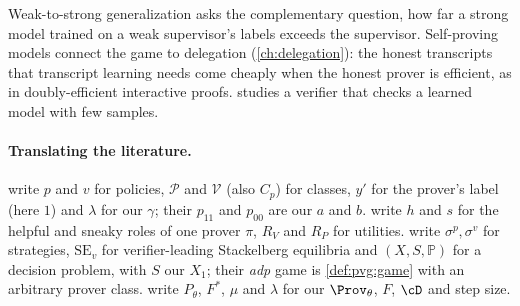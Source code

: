 \begin{refsection}
Weak-to-strong generalization \parencite{BurnsEtAl2024} asks the complementary question, how far a strong model trained on a weak supervisor's labels exceeds the supervisor. Self-proving models connect the game to delegation (\cref{ch:delegation}): the honest transcripts that transcript learning needs come cheaply when the honest prover is efficient, as in doubly-efficient interactive proofs.  studies a verifier that checks a learned model with few samples.

\paragraph{Translating the literature.} \Textcite{AnilEtAl2021} write $p$ and $v$ for policies, $\mathcal{P}$ and $\mathcal{V}$ (also $C_p$) for classes, $y'$ for the prover's label (here $1$) and $\lambda$ for our $\gamma$; their $p_{11}$ and $p_{00}$ are our $a$ and $b$. \Textcite{KirchnerEtAl2024} write $h$ and $s$ for the helpful and sneaky roles of one prover $\pi$, $R_V$ and $R_P$ for utilities. \Textcite{HammondAdamDay2025} write $\sigma^p,\sigma^v$ for strategies, $\mathrm{SE}_v$ for verifier-leading Stackelberg equilibria and $(X,S,\mathbb{P})$ for a decision problem, with $S$ our $X_1$; their \emph{adp} game is \cref{def:pvg:game} with an arbitrary prover class. \Textcite{AmitEtAl2025} write $P_\theta$, $F^*$, $\mu$ and $\lambda$ for our $\Prov_\theta$, $F$, $\cD$ and step size.

\printchapterbib
\end{refsection}
